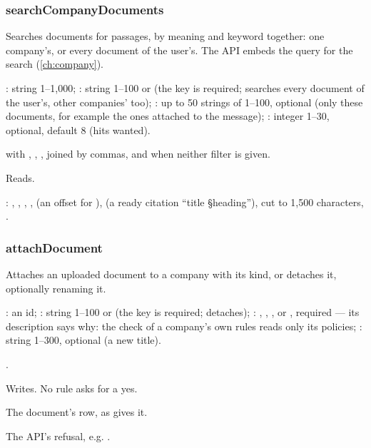 \subsubsection{searchCompanyDocuments}\label{sec:tools:searchCompanyDocuments}
\begin{description}[style=multiline, leftmargin=19mm, labelwidth=17mm, labelsep=2mm,
  font=\sffamily\bfseries\footnotesize\color{ink}, itemsep=1pt, topsep=2pt, before=\raggedright]
  \item[Does] Searches documents for passages, by meaning and keyword together: one
    company's, or every document of the user's. The API embeds the query for the search
    (\cref{ch:company}).
  \item[Input] : string 1--1,000; : string 1--100 or 
    (the key is required;  searches every document of the user's, other
    companies' too); : up to 50 strings of 1--100, optional (only these
    documents, for example the ones attached to the message); : integer 1--30,
    optional, default 8 (hits wanted).
  \item[Calls]  with , , ,
     joined by commas, and  when neither filter is given.
  \item[Kind] Reads.
  \item[Returns] : , , ,
    ,  (an offset for ),  (a ready
    citation \enquote{title §heading}),  cut to 1,500 characters, .
\end{description}

\subsubsection{attachDocument}\label{sec:tools:attachDocument}
\begin{description}[style=multiline, leftmargin=19mm, labelwidth=17mm, labelsep=2mm,
  font=\sffamily\bfseries\footnotesize\color{ink}, itemsep=1pt, topsep=2pt, before=\raggedright]
  \item[Does] Attaches an uploaded document to a company with its kind, or detaches it,
    optionally renaming it.
  \item[Input] : an id; : string 1--100 or  (the
    key is required;  detaches); : , ,
    ,  or , required --- its description says why:
    the check of a company's own rules reads only its policies; : string 1--300,
    optional (a new title).
  \item[Calls] .
  \item[Kind] Writes. No rule asks for a yes.
  \item[Returns] The document's row, as  gives it.
  \item[Errors] The API's refusal, e.g. .
\end{description}


